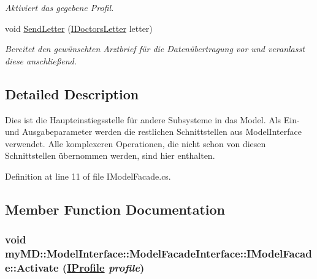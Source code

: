 \begin{CompactItemize}
\begin{CompactList}\small\item\em Aktiviert das gegebene Profil. \item\end{CompactList}\item 
void \hyperlink{interfacemy_m_d_1_1_model_interface_1_1_model_facade_interface_1_1_i_model_facade_dbd560ba513112ff2c7fcf625fdf6597}{Send\-Letter} (\hyperlink{interfacemy_m_d_1_1_model_interface_1_1_data_model_interface_1_1_i_doctors_letter}{IDoctors\-Letter} letter)
\begin{CompactList}\small\item\em Bereitet den gew\"{u}nschten Arztbrief f\"{u}r die Daten\"{u}bertragung vor und veranlasst diese anschlie\ss{}end. \item\end{CompactList}\end{CompactItemize}


\subsection{Detailed Description}
Dies ist die Haupteinstiegsstelle f\"{u}r andere Subsysteme in das Model. Als Ein- und Ausgabeparameter werden die restlichen Schnittstellen aus Model\-Interface verwendet. Alle komplexeren Operationen, die nicht schon von diesen Schnittstellen \"{u}bernommen werden, sind hier enthalten. 



Definition at line 11 of file IModel\-Facade.cs.

\subsection{Member Function Documentation}
\hypertarget{interfacemy_m_d_1_1_model_interface_1_1_model_facade_interface_1_1_i_model_facade_6ffa7bbff9bc4db881433251a158fbd0}{
\subsubsection[Activate]{\setlength{\rightskip}{0pt plus 5cm}void my\-MD::Model\-Interface::Model\-Facade\-Interface::IModel\-Facade::Activate (\hyperlink{interfacemy_m_d_1_1_model_interface_1_1_data_model_interface_1_1_i_profile}{IProfile} {\em profile})}}
\label{de/d3e/interfacemy_m_d_1_1_model_interface_1_1_model_facade_interface_1_1_i_model_facade_6ffa7bbff9bc4db881433251a158fbd0}


